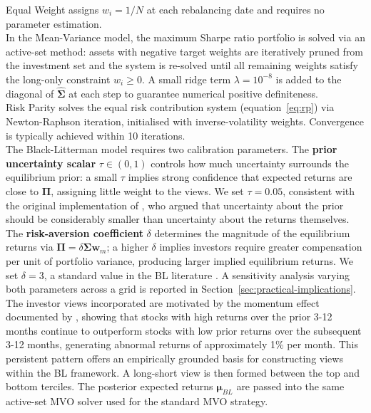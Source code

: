 \documentclass[a4paper,alpha-refs]{scr-contemporary}
\numberwithin{equation}{section}
\begin{document}
\indent Equal Weight assigns $w_i = 1/N$ at each rebalancing date 
and requires no parameter estimation. \\

\indent In the Mean-Variance model, the maximum Sharpe ratio portfolio is solved 
via an active-set method: assets with negative target weights are iteratively pruned from the
investment set and the system is re-solved until all remaining weights satisfy
the long-only constraint $w_i \geq 0$. A small ridge term $\lambda = 10^{-8}$
is added to the diagonal of $\hat{\boldsymbol{\Sigma}}$ at each step to
guarantee numerical positive definiteness. \\

\indent Risk Parity solves the equal risk contribution system
(equation~\ref{eq:rp}) via Newton-Raphson iteration, initialised with
inverse-volatility weights. Convergence is typically achieved within 10
iterations. \\

\indent The Black-Litterman model requires two calibration parameters.
The \textbf{prior uncertainty scalar} $\tau \in (0,1)$ controls how much uncertainty
surrounds the equilibrium prior: a small $\tau$ implies strong confidence that expected
returns are close to $\boldsymbol{\Pi}$, assigning little weight to the views. We set
$\tau = 0.05$, consistent with the original implementation of
\citet{he_intuition_2002}, who argued that uncertainty about the prior should be
considerably smaller than uncertainty about the returns themselves. \newline 
\indent The \textbf{risk-aversion coefficient} $\delta$ determines the magnitude of the
equilibrium returns via $\boldsymbol{\Pi} = \delta \boldsymbol{\Sigma}
\mathbf{w}_m$; a higher $\delta$ implies investors require greater compensation per unit
of portfolio variance, producing larger implied equilibrium returns. We set $\delta = 3$,
a standard value in the BL literature \citep{walters_black-litterman_2011}. A sensitivity
analysis varying both parameters across a grid is reported in
Section~\ref{sec:practical-implications}. \newline
\indent The investor views incorporated are motivated by the momentum effect documented by
\citet{jegadeesh_returns_1993}, showing that stocks with high returns over the prior 
3-12 months continue to outperform stocks with low prior returns over the subsequent 
3-12 months, generating abnormal returns of approximately 1\% per month. 
This persistent pattern offers an empirically grounded basis for constructing views 
within the BL framework. \newline 
\indent A long-short view is then formed between the top and
bottom terciles. The posterior expected returns $\boldsymbol{\mu}_{BL}$ are passed
into the same active-set MVO solver used for the standard MVO strategy.
\end{document}
